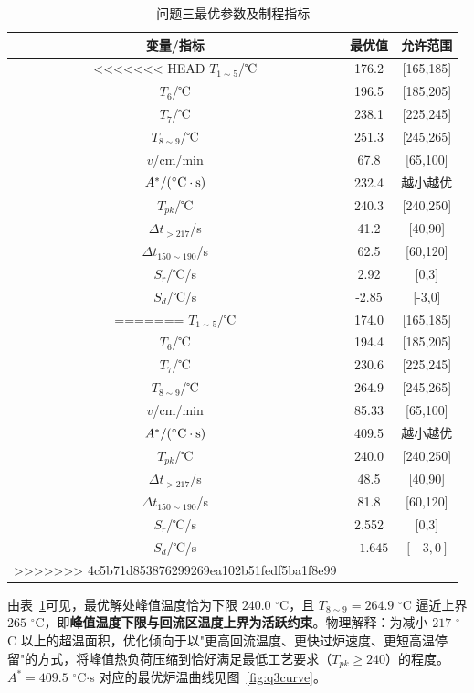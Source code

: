 \documentclass{cumcmthesis}
\begin{document}
\begin{table}[H]
\centering
\caption{问题三最优参数及制程指标}
\label{tab:q3result}
\begin{tabular}{ccc}
\toprule
变量/指标 & 最优值 & 允许范围\\
\midrule
<<<<<<< HEAD
$T_{1\sim5}$/℃ & 176.2 & [165,185]\\
$T_6$/℃ & 196.5 & [185,205]\\
$T_7$/℃ & 238.1 & [225,245]\\
$T_{8\sim9}$/℃ & 251.3 & [245,265]\\
$v$/cm/min & 67.8 & [65,100]\\
\midrule
$A^*/({}^\circ{\rm C}\cdot{\rm s})$ & 232.4 & 越小越优\\
$T_{pk}$/℃ & 240.3 & [240,250]\\
$\Delta t_{>217}$/s & 41.2 & [40,90]\\
$\Delta t_{150\sim190}$/s & 62.5 & [60,120]\\
$S_r$/℃/s & 2.92 & [0,3]\\
$S_d$/℃/s & -2.85 & [-3,0]\\
=======
$T_{1\sim5}$/℃ & 174.0 & [165,185]\\
$T_6$/℃ & 194.4 & [185,205]\\
$T_7$/℃ & 230.6 & [225,245]\\
$T_{8\sim9}$/℃ & 264.9 & [245,265]\\
$v$/cm/min & 85.33 & [65,100]\\
\midrule
$A^*/({}^\circ{\rm C}\cdot{\rm s})$ & 409.5 & 越小越优\\
$T_{pk}$/℃ & 240.0 & [240,250]\\
$\Delta t_{>217}$/s & 48.5 & [40,90]\\
$\Delta t_{150\sim190}$/s & 81.8 & [60,120]\\
$S_r$/℃/s & 2.552 & [0,3]\\
$S_d$/℃/s & $-1.645$ & $[-3,0]$\\
>>>>>>> 4c5b71d853876299269ea102b51fedf5ba1f8e99
\bottomrule
\end{tabular}
\end{table}

由表~\ref{tab:q3result}可见，最优解处峰值温度恰为下限 $240.0$ $^\circ$C，且 $T_{8\sim9}=264.9$ $^\circ$C 逼近上界 $265$ $^\circ$C，即\textbf{峰值温度下限与回流区温度上界为活跃约束}。物理解释：为减小 $217$ $^\circ$C 以上的超温面积，优化倾向于以"更高回流温度、更快过炉速度、更短高温停留"的方式，将峰值热负荷压缩到恰好满足最低工艺要求（$T_{pk}\ge240$）的程度。$A^*=409.5$ $^\circ$C$\cdot$s 对应的最优炉温曲线见图~\ref{fig:q3curve}。
\end{document}
